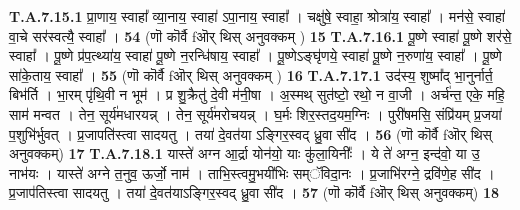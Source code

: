\documentclass[17pt]{extarticle}
\begin{document}
                                \textbf{ T.A.7.15.1} \newline
                  प्रा॒णाय॒ स्वाहा᳚ व्या॒नाय॒ स्वाहा॑ ऽपा॒नाय॒ स्वाहा᳚ ।  चक्षु॑षे॒ स्वाहा॒ श्रोत्रा॑य॒ स्वाहा᳚ ।  मन॑से॒ स्वाहा॑ वा॒चे सर॑स्वत्यै॒ स्वाहा᳚ । \textbf{ 54} \newline
                  \newline
                                                        (णॊ कॊर्वै fऒर् थिस् अनुवक्कम् ) \textbf{15} \newline \newline
                                \textbf{ T.A.7.16.1} \newline
                  पू॒ष्णे स्वाहा॑ पू॒ष्णे शर॑से॒ स्वाहा᳚ ।  पू॒ष्णे प्र॑प॒त्थ्या॑य॒ स्वाहा॑ पू॒ष्णे न॒रन्धि॑षाय॒ स्वाहा᳚ । पू॒ष्णेऽङ्घृ॑णये॒ स्वाहा॑ पू॒ष्णे न॒रुणा॑य॒ स्वाहा᳚ ।  पू॒ष्णे सा॑के॒ताय॒ स्वाहा᳚ । \textbf{ 55} \newline
                  \newline
                                                        (णॊ कॊर्वै fऒर् थिस् अनुवक्कम् ) \textbf{16} \newline \newline
                                \textbf{ T.A.7.17.1} \newline
                  उद॑स्य॒ शुष्मा᳚द् भा॒नुर्नार्त॒ बिभ॑र्ति । भा॒रम् पृ॑थि॒वी न भूम॑ । प्र शु॒क्रैतु॑ दे॒वी म॑नी॒षा । अ॒स्मथ् सुत॑ष्टो॒ रथो॒ न वा॒जी । अर्च॑न्त॒ एके॒ महि॒ साम॑ मन्वत । तेन॒ सूर्य॑मधारयन्न् ।  तेन॒ सूर्य॑मरोचयन्न् । घ॒र्मः शिर॒स्तद॒यम॒ग्निः ।  पुरी॑षमसि॒ संप्रि॑यम् प्र॒जया॑ प॒शुभि॑र्भुवत् । प्र॒जापति॑स्त्वा सादयतु । तया॑ दे॒वत॑या ऽङ्गिर॒स्वद् ध्रु॒वा सी॑द । \textbf{ 56} \newline
                  \newline
                                                        (णॊ कॊर्वै fऒर् थिस् अनुवक्कम्) \textbf{17} \newline \newline
                                \textbf{ T.A.7.18.1} \newline
                  यास्ते॑ अग्न आ॒र्द्रा योन॑यो॒ याः कु॑ला॒यिनीः᳚ ।  ये ते॑ अग्न॒ इन्द॑वो॒ या उ॒ नाभ॑यः । यास्ते॑ अग्ने त॒नुव॒ ऊर्जो॒ नाम॑ । ताभि॒स्त्वमु॒भयी॑भिः सम्ॅविदा॒नः । प्र॒जाभि॑रग्ने॒ द्रवि॑णे॒ह सी॑द ।  प्र॒जाप॑तिस्त्वा सादयतु । तया॑ दे॒वत॑याऽङ्गिर॒स्वद् ध्रु॒वा सी॑द । \textbf{ 57} \newline
                  \newline
                                                        (णॊ कॊर्वै fऒर् थिस् अनुवक्कम्) \textbf{18} \newline \newline
\end{document}
